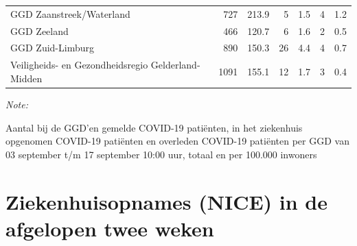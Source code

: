 \documentclass[
  english,
  man,floatsintext]{apa6}
\begin{document}
\begin{table}
\begin{threeparttable}
\begin{tabular}{lrrrrrr}
GGD Zaanstreek/Waterland & 727 & 213.9 & 5 & 1.5 & 4 & 1.2\\
GGD Zeeland & 466 & 120.7 & 6 & 1.6 & 2 & 0.5\\
GGD Zuid-Limburg & 890 & 150.3 & 26 & 4.4 & 4 & 0.7\\
Veiligheids- en Gezondheidsregio Gelderland-Midden & 1091 & 155.1 & 12 & 1.7 & 3 & 0.4\\
\bottomrule
\end{tabular}
\begin{tablenotes}
\item \textit{Note: } 
\item Aantal bij de GGD’en gemelde COVID-19 patiënten, in het ziekenhuis opgenomen COVID-19 patiënten en overleden COVID-19 patiënten per GGD van 03 september t/m 17 september 10:00 uur, totaal en per 100.000 inwoners
\end{tablenotes}
\end{threeparttable}
\endgroup{}
\end{table}

\newpage

\hypertarget{ziekenhuisopnames-nice-in-de-afgelopen-twee-weken}{%
\section{Ziekenhuisopnames (NICE) in de afgelopen twee weken}\label{ziekenhuisopnames-nice-in-de-afgelopen-twee-weken}}
\end{document}

